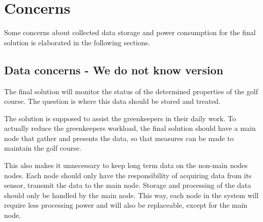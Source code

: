 \section{Concerns}
Some concerns about collected data storage and power consumption for the final solution is elaborated in the following sections.

\subsection{Data concerns - We do not know version}
The final solution will monitor the status of the determined properties of the golf course. The question is where this data should be stored and treated.

The solution is supposed to assist the greenkeepers in their daily work. To actually reduce the greenkeepers workload, the final solution should have a main node that gather and presents the data, so that measures can be made to maintain the golf course.

This also makes it unnecessary to keep long term data on the non-main nodes nodes. 
Each node should only have the responsibility of acquiring data from its sensor, transmit the data to the main node. 
Storage and processing of the data should only be handled by the main node. This way, each node in the system will require less processing power and will also be replaceable, except for the main node.



